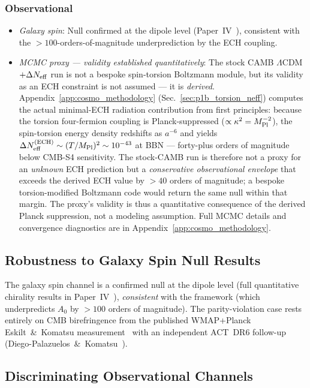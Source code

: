 \documentclass[aps,prd,twocolumn,superscriptaddress,showpacs,preprintnumbers,nofootinbib,longbibliography,floatfix]{revtex4-2}
\newcommand{\MPl}{M_{\rm Pl}}
\newcommand{\Neff}{N_{\rm eff}}
\begin{document}
\subsubsection{Observational}
\begin{itemize}[leftmargin=*]
\item \textit{Galaxy spin}: Null confirmed at the dipole level (Paper~IV~\cite{Golden2026P4}),
consistent with the $>100$-orders-of-magnitude underprediction by the ECH coupling.
\item \textit{MCMC proxy --- validity established quantitatively}: The stock
CAMB $\Lambda$CDM$+\Delta\Neff$ run is not a bespoke spin-torsion Boltzmann
module, but its validity as an ECH constraint is not assumed --- it is
\emph{derived}. Appendix~\ref{app:cosmo_methodology}
(Sec.~\ref{sec:p1b_torsion_neff}) computes the actual minimal-ECH radiation
contribution from first principles: because the torsion four-fermion coupling is
Planck-suppressed ($\propto\kappa^2=\MPl^{-2}$), the spin-torsion energy density
redshifts as $a^{-6}$ and yields $\Delta\Neff^{\rm(ECH)}\sim(T/\MPl)^2\sim
10^{-43}$ at BBN --- forty-plus orders of magnitude below CMB-S4 sensitivity.
The stock-CAMB run is therefore not a proxy for an \emph{unknown} ECH prediction
but a \emph{conservative observational envelope} that exceeds the derived ECH
value by $>\!40$ orders of magnitude; a bespoke torsion-modified Boltzmann code
would return the same null within that margin. The proxy's validity is thus a
quantitative consequence of the derived Planck suppression, not a modeling
assumption. Full MCMC details and convergence diagnostics are in
Appendix~\ref{app:cosmo_methodology}.
\end{itemize}

\subsection{Robustness to Galaxy Spin Null Results}\label{sec:spinnull}

The galaxy spin channel is a confirmed null at the dipole level (full
quantitative chirality results in Paper~IV~\cite{Golden2026P4}),
\textit{consistent} with the framework (which underpredicts $A_0$ by
$>100$ orders of magnitude). The parity-violation case
rests entirely on CMB birefringence from the published WMAP+Planck
Eskilt~\&~Komatsu measurement~\cite{Eskilt2022} with an independent
ACT~DR6 follow-up (Diego-Palazuelos~\&~Komatsu~\cite{DiegoPalazuelos2025}).

\subsection{Discriminating Observational Channels}
\end{document}
